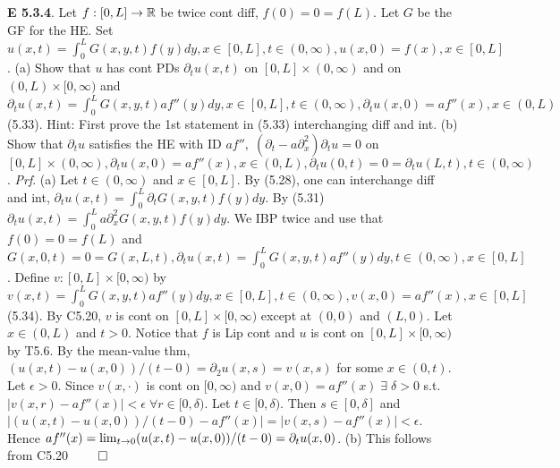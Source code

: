 {\bf E 5.3.4}. Let $f: [0, L] \rightarrow \mathbb{R}$ be twice cont diff, $f(0) = 0 = f(L)$. Let $G$ be the GF for the HE. Set $u(x,t) = \int_0^L G(x,y,t) f(y) dy, x \in [0,L], t \in (0, \infty), u(x,0) = f(x), x \in [0, L]$. (a) Show that $u$ has cont PDs $\partial_t u(x,t)$ on $[0, L] \times (0, \infty)$ and on $(0, L) \times [0, \infty)$ and $\partial_t u(x,t) = \int_0^L G(x,y,t) a f''(y) dy, x \in [0,L], t \in (0, \infty), \partial_t u(x,0) = af''(x), x \in (0, L)$ (5.33). Hint: First  prove the 1st statement in (5.33) interchanging diff and int. (b) Show that $\partial_t u$ satisfies the HE with ID $af'', \; (\partial_t - a \partial_x^2 )\partial_t u = 0$ on $[0, L] \times (0, \infty), \partial_t u(x,0) = a f''(x), x \in (0, L), \partial_t u(0,t) = 0 = \partial_t u(L,t), t \in (0, \infty)$. {\it Prf}. (a) Let $t \in (0, \infty)$ and $x \in [0, L]$. By (5.28), one can interchange diff and int, $\partial_t u(x,t) = \int_0^L \partial_t G(x,y,t) f(y) dy$. By (5.31) $\partial_t u(x,t) = \int_0^L a\partial_x^2 G(x,y,t) f(y) dy$. We IBP twice and use that $f(0) = 0 = f(L)$ and $G(x,0,t) = 0 = G(x,L,t), \partial_t u(x,t) = \int_0^L G(x,y,t) a f''(y) dy, t \in (0, \infty), x \in [0,L]$. Define $v: [0, L] \times [0, \infty)$ by $v(x,t) =\int_0^L G(x,y,t) a f''(y) dy, x \in [0,L], t \in (0, \infty), v(x,0) = a f''(x), x \in [0,L]$ (5.34). By C5.20, $v$ is cont on $[0, L] \times [0, \infty)$ except at $(0,0)$ and $(L,0)$. Let $x \in (0,L)$ and $t > 0$. Notice that $f$ is Lip cont and $u$ is cont on $[0,L] \times [0, \infty)$ by T5.6. By the mean-value thm, $(u(x,t)-u(x,0))/(t-0) = \partial_2 u(x,s) = v(x,s)$ for some $x \in (0,t)$. Let $\epsilon >0$. Since $v(x,\cdot)$ is cont on $[0, \infty)$ and $v(x,0) = a f''(x)\; \exists \;\delta >0$ s.t. $|v(x,r) - a f''(x)| < \epsilon \; \forall r \in [0, \delta)$. Let $t \in [0, \delta)$. Then $s \in [0, \delta]$ and $|(u(x,t)-u(x,0))/(t-0) - a f''(x)| = |v(x,s)-a f''(x)| < \epsilon$. Hence $a f''(x) = \lim_{t \rightarrow 0} (u(x,t)-u(x,0))/(t-0) = \partial_t u(x,0)$. (b) This follows from C5.20 $\qed$